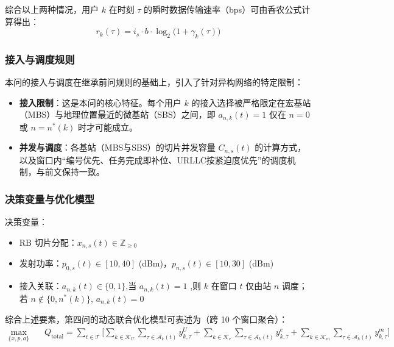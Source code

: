 综合以上两种情况，用户 $k$ 在时刻 $\tau$ 的瞬时数据传输速率（bps）可由香农公式计算得出：
\begin{equation}
 r_k(\tau)=i_s\cdot b\cdot \log_2\big(1+\gamma_k(\tau)\big)
\end{equation}


\subsubsection{接入与调度规则}

本问的接入与调度在继承前问规则的基础上，引入了针对异构网络的特定限制：
\begin{itemize}
  \item \textbf{接入限制}：这是本问的核心特征。每个用户 $k$ 的接入选择被严格限定在宏基站（MBS）与地理位置最近的微基站（SBS）之间，即 $a_{n,k}(t)=1$ 仅在 $n=0$ 或 $n=n^*(k)$ 时才可能成立。
  \item \textbf{并发与调度}：各基站（MBS与SBS）的切片并发容量 $C_{n,s}(t)$ 的计算方式，以及窗口内“编号优先、任务完成即补位、URLLC按紧迫度优先”的调度机制，与前文保持一致。
\end{itemize}

\subsubsection{决策变量与优化模型}

决策变量：
\begin{itemize}
  \item RB 切片分配：$x_{n,s}(t)\in\mathbb{Z}_{\ge 0}$
  \item 发射功率：$p_{0,s}(t)\in[10,40]$ (dBm)，$p_{n,s}(t)\in[10,30]$ (dBm)
  \item 接入关联：$a_{n,k}(t)\in\{0,1\}$,当 $a_{n,k}(t)=1$ ,则 $k$ 在窗口 $t$ 仅由站 $n$ 调度；若 $n\notin\{0,n^*(k)\}$, $a_{n,k}(t)=0$
\end{itemize}
综合上述要素，第四问的动态联合优化模型可表述为（跨 10 个窗口聚合）：
\begin{equation}
\begin{aligned}
\max\limits_{\{x,p,a\}}\quad & Q_{\text{total}}=\sum_{t\in\mathcal{T}}\Bigg[\sum_{k\in\mathcal{K}_U}\sum_{\tau\in\mathcal{A}_k(t)} y^{U}_{k,\tau}+\sum_{k\in\mathcal{K}_e}\sum_{\tau\in\mathcal{A}_k(t)} y^{e}_{k,\tau}+\sum_{k\in\mathcal{K}_m}\sum_{\tau\in\mathcal{A}_k(t)} y^{m}_{k,\tau}\Bigg] 
\end{aligned}
\end{equation}

